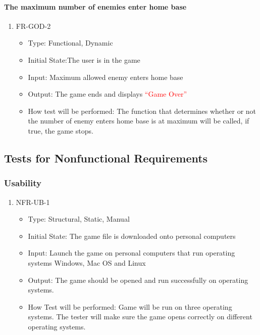 \documentclass[12,english]{article}
\begin{document}
\paragraph{The maximum number of enemies enter home base}
\begin{enumerate}
  \item FR-GOD-2
  \begin{itemize}
      \item Type: Functional, Dynamic
      \item Initial State:The user is in the game
      \item Input: Maximum allowed enemy enters home base
      \item Output: The game ends and displays \textcolor{red}{``Game Over''}
      \item How test will be performed: The function that determines whether or not the number of enemy enters home base is at maximum will be called, if true, the game stops.
  \end{itemize}
\end{enumerate}

\subsection{Tests for Nonfunctional Requirements}
\subsubsection{Usability}
\begin{enumerate}
    \item NFR-UB-1
    \begin{itemize}
        \item Type: Structural, Static, Manual
        \item Initial State: The game file is downloaded onto personal computers
        \item Input: Launch the game on personal computers that run operating systems Windows, Mac OS and Linux
        \item Output: The game should be opened and run successfully on operating systems.
        \item How Test will be performed: Game will be run on three operating systems. The tester will make sure the game opens correctly on different operating systems.
    \end{itemize}
\end{enumerate}
\end{document}
